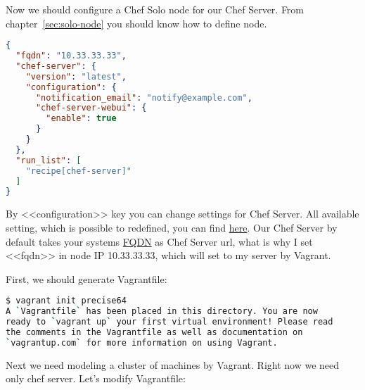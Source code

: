 Now we should configure a Chef Solo node for our Chef Server. From chapter~\ref{sec:solo-node} you should know how to define node.

\begin{lstlisting}[language=JSON,label=lst:my-server-cloud-installation4,title=my-server-cloud/nodes/chef-server.example.com.json]
{
  "fqdn": "10.33.33.33",
  "chef-server": {
    "version": "latest",
    "configuration": {
      "notification_email": "notify@example.com",
      "chef-server-webui": {
        "enable": true
      }
    }
  },
  "run_list": [
    "recipe[chef-server]"
  ]
}
\end{lstlisting}

By <<configuration>> key you can change settings for Chef Server. All available setting, which is possible to redefined, you can find \href{https://github.com/opscode/omnibus-chef-server/blob/master/files/chef-server-cookbooks/chef-server/attributes/default.rb}{here}. Our Chef Server by default takes your systems \href{http://en.wikipedia.org/wiki/Fully\_qualified\_domain\_name}{FQDN} as Chef Server url, what is why I set <<fqdn>> in node IP 10.33.33.33, which will set to my server by Vagrant.

First, we should generate Vagrantfile:

\begin{lstlisting}[language=Bash,label=lst:my-server-cloud-installation5]
$ vagrant init precise64
A `Vagrantfile` has been placed in this directory. You are now
ready to `vagrant up` your first virtual environment! Please read
the comments in the Vagrantfile as well as documentation on
`vagrantup.com` for more information on using Vagrant.
\end{lstlisting}

Next we need modeling a cluster of machines by Vagrant. Right now we need only chef server. Let's modify Vagrantfile:

